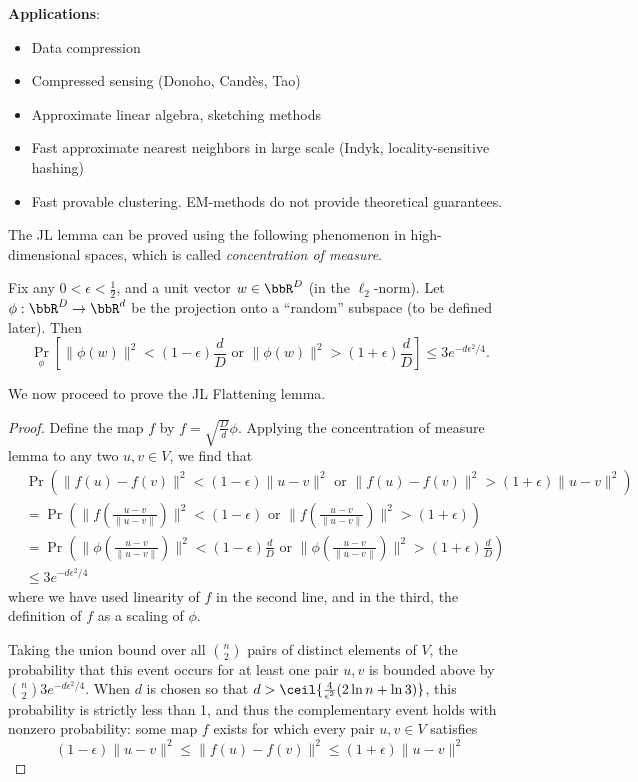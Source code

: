 \textbf{Applications}:
\begin{itemize}
\item Data compression
\item Compressed sensing (Donoho, Cand\`{e}s, Tao)
\item Approximate linear algebra, sketching methods
\item Fast approximate nearest neighbors in large scale (Indyk, locality-sensitive hashing)
\item Fast provable clustering. EM-methods do not provide theoretical guarantees.
\end{itemize}

The JL lemma can be proved using the following phenomenon 
in high-dimensional spaces, which is called \emph{concentration of measure}.

\begin{lemma} \label{concentration}
Fix any $0 < \epsilon < \frac{1}{2}$, and a unit vector $w \in \bbR^D$ 
(in the $\ell_2$-norm). Let $\phi: \bbR^D \rightarrow \bbR^d$ 
be the projection onto a ``random'' subspace (to be defined later). Then
\[\Pr_\phi \left[\|\phi(w)\|^2 < (1-\epsilon)\frac{d}{D} \textrm{ or }
  \|\phi (w)\|^2 > (1+\epsilon)\frac{d}{D}\right]\leq 3 e^{-d
  \epsilon^2/4}.\] 
\end{lemma}

We now proceed to prove the JL Flattening lemma.

\begin{proof}
Define the map $f$ by $f = \sqrt{\frac{D}{d}}\phi$. Applying the 
concentration of measure lemma to any two $u,v \in V$, we find that
\begin{align*}
&\Pr \left( \|f(u)-f(v)\|^2 < (1-\epsilon)\|u-v\|^2\textrm{ or } 
\|f(u)-f(v)\|^2 > (1+\epsilon)\|u-v\|^2 \right) \\
&= \Pr\left( \|f(\frac{u-v}{\|u-v\|})\|^2 < (1-\epsilon)\textrm{ or } 
\|f(\frac{u-v}{\|u-v\|})\|^2 >
(1+\epsilon) \right) \\
&= \Pr\left( \|\phi(\frac{u-v}{\|u-v\|})\|^2 < (1-\epsilon) \frac{d}{D} \textrm{ or } \|\phi(\frac{u-v}{\|u-v\|})\|^2 >
(1+\epsilon)\frac{d}{D} \right) \\
&\leq 3e^{-d\epsilon^2/4}
\end{align*}
where we have used linearity of $f$ in the second line, and in the 
third, the definition of $f$ as a scaling of $\phi$.

Taking the union bound over all $\binom{n}{2}$ pairs of distinct 
elements of $V$, the probability that this event occurs for at least one 
pair $u,v$ is bounded above by $\binom{n}{2} 3e^{-d\epsilon^2/4}$. When 
$d$ is chosen so that $d > \ceil{\frac{4}{\epsilon^2}(2\ln n + \ln 3)}$,
 this probability is strictly less than 1, and thus the complementary 
 event holds with nonzero probability: some map $f$ exists for which 
 every pair $u,v \in V$ satisfies 
$$(1-\epsilon)\|u-v\|^2 \leq \|f(u)-f(v)\|^2 \leq (1+\epsilon)\|u-v\|^2$$
\end{proof}

